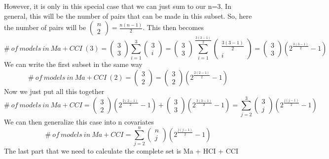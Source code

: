 However, it is only in this special case that we can just sum to our n=3. In general, this will be the number of pairs that can be made in this subset. So, here the number of pairs will be $\left( \begin{array}{c}
n \\ 
2 \end{array}
\right)=\frac{n\left(n-1\right)}{2}$. This then becomes
\[\#\ of\ models\ in\ Ma+CCI\ \left(3\right)=\left( \begin{array}{c}
3 \\ 
3 \end{array}
\right)\sum^3_{i=1}{\left( \begin{array}{c}
3 \\ 
i \end{array}
\right)}=\left( \begin{array}{c}
3 \\ 
3 \end{array}
\right)\sum^{\frac{3\left(3-1\right)}{2}}_{i=1}{\left( \begin{array}{c}
\frac{3\left(3-1\right)}{2} \\ 
i \end{array}
\right)}=\left( \begin{array}{c}
3 \\ 
3 \end{array}
\right)\left(2^{\frac{3\left(3-1\right)}{2}}-1\right)\] 
We can write the first subset in the same way
\[\#\ of\ models\ in\ Ma+CCI\ \left(2\right)=\left( \begin{array}{c}
3 \\ 
2 \end{array}
\right)=\left( \begin{array}{c}
3 \\ 
2 \end{array}
\right)\left(2^{\frac{2\left(2-1\right)}{2}}-1\right)\] 
Now we just put all this together
\[\#\ of\ models\ in\ Ma+CCI=\left( \begin{array}{c}
3 \\ 
2 \end{array}
\right)\left(2^{\frac{2\left(2-1\right)}{2}}-1\right)+\left( \begin{array}{c}
3 \\ 
3 \end{array}
\right)\left(2^{\frac{3\left(3-1\right)}{2}}-1\right)=\sum^3_{j=2}{\left( \begin{array}{c}
3 \\ 
j \end{array}
\right)\left(2^{\frac{j\left(j-1\right)}{2}}-1\right)}\] 
We can then generalize this case into n covariates
\[\#\ of\ models\ in\ Ma+CCI=\sum^n_{j=2}{\left( \begin{array}{c}
n \\ 
j \end{array}
\right)\left(2^{\frac{j\left(j-1\right)}{2}}-1\right)}\] 
The last part that we need to calculate the complete set is Ma + HCI + CCI

